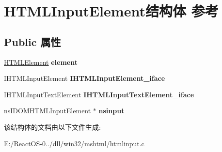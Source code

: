 \hypertarget{struct_h_t_m_l_input_element}{}\section{H\+T\+M\+L\+Input\+Element结构体 参考}
\label{struct_h_t_m_l_input_element}
\subsection*{Public 属性}
\begin{DoxyCompactItemize}
\item 
\mbox{\label{struct_h_t_m_l_input_element_a768eab05f11c9c7d00d2c07c52cbe261}} 
\hyperlink{struct_h_t_m_l_element}{H\+T\+M\+L\+Element} {\bfseries element}
\item 
\mbox{\label{struct_h_t_m_l_input_element_a12a5814bf411878806286ef5965cfc65}} 
I\+H\+T\+M\+L\+Input\+Element {\bfseries I\+H\+T\+M\+L\+Input\+Element\+\_\+iface}
\item 
\mbox{\label{struct_h_t_m_l_input_element_ab3b8578429f0c517b66a7ef26f14a869}} 
I\+H\+T\+M\+L\+Input\+Text\+Element {\bfseries I\+H\+T\+M\+L\+Input\+Text\+Element\+\_\+iface}
\item 
\mbox{\label{struct_h_t_m_l_input_element_a70e84c45d9ddc268fed8cda809787794}} 
\hyperlink{interfacens_i_d_o_m_h_t_m_l_input_element}{ns\+I\+D\+O\+M\+H\+T\+M\+L\+Input\+Element} $\ast$ {\bfseries nsinput}
\end{DoxyCompactItemize}


该结构体的文档由以下文件生成\+:\begin{DoxyCompactItemize}
\item 
E\+:/\+React\+O\+S-\/0../dll/win32/mshtml/htmlinput.\+c\end{DoxyCompactItemize}
